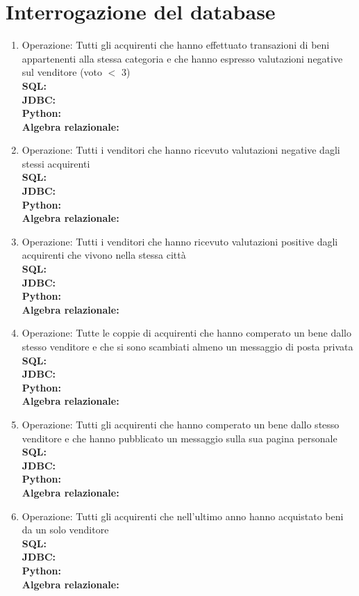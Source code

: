 \documentclass[a4paper, 10pt]{report}
\begin{document}
\chapter{Interrogazione del database}
\begin{enumerate}
\item Operazione: Tutti gli acquirenti che hanno effettuato transazioni di beni appartenenti alla stessa categoria e che hanno espresso valutazioni negative sul venditore (voto $<$ 3)\\
\textbf{SQL:}\\
\textbf{JDBC:}\\
\textbf{Python:}\\
\textbf{Algebra relazionale:}\\

\item Operazione: Tutti i venditori che hanno ricevuto valutazioni negative dagli stessi acquirenti\\

\textbf{SQL:}\\
\textbf{JDBC:}\\
\textbf{Python:}\\
\textbf{Algebra relazionale:}\\

\item Operazione: Tutti i venditori che hanno ricevuto valutazioni positive dagli acquirenti che vivono nella stessa citt\`a \\

\textbf{SQL:}\\
\textbf{JDBC:}\\
\textbf{Python:}\\
\textbf{Algebra relazionale:}\\

\item Operazione: Tutte le coppie di acquirenti che hanno comperato un bene dallo stesso venditore e che si sono scambiati almeno un messaggio di posta privata\\

\textbf{SQL:}\\
\textbf{JDBC:}\\
\textbf{Python:}\\
\textbf{Algebra relazionale:}\\

\item Operazione: Tutti gli acquirenti che hanno comperato un bene dallo stesso venditore e che hanno pubblicato un messaggio sulla sua pagina personale\\

\textbf{SQL:}\\
\textbf{JDBC:}\\
\textbf{Python:}\\
\textbf{Algebra relazionale:}\\

\item Operazione: Tutti gli acquirenti che nell'ultimo anno hanno acquistato beni da un solo venditore\\

\textbf{SQL:}\\
\textbf{JDBC:}\\
\textbf{Python:}\\
\textbf{Algebra relazionale:}\\

\end{enumerate}
\end{document}
